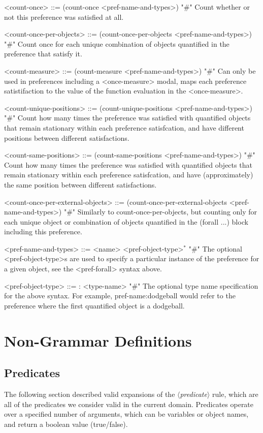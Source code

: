 \documentclass{article}
\newcommand{\dsl}[1]{{\it $\langle$#1$\rangle$}}
\begin{document}
\begin{grammar}
<count-once> ::= (count-once <pref-name-and-types>) "#" Count whether or not this preference was satisfied at all.

<count-once-per-objects> ::= (count-once-per-objects <pref-name-and-types>) "#" Count once for each unique combination of objects quantified in the preference that satisfy it.

<count-measure> ::= (count-measure <pref-name-and-types>) "#" Can only be used in preferences including a <once-measure> modal, maps each preference satistifaction to the value of the function evaluation in the <once-measure>.

<count-unique-positions> ::= (count-unique-positions <pref-name-and-types>) "#" Count how many times the preference was satisfied with quantified objects that remain stationary within each preference satisfcation, and have different positions between different satisfactions.

<count-same-positions> ::= (count-same-positions <pref-name-and-types>) "#" Count how many times the preference was satisfied with quantified objects that remain stationary within each preference satisfcation, and have (approximately) the same position between different satisfactions.

<count-once-per-external-objects> ::=  (count-once-per-external-objects <pref-name-and-types>) "#" Similarly to count-once-per-objects, but counting only for each unique object or combination of objects quantified in the (forall ...) block including this preference.

<pref-name-and-types> ::= <name> <pref-object-type>$^*$ "#" The optional <pref-object-type>s are used to specify a particular instance of the preference for a given object, see the <pref-forall> syntax above.

    <pref-object-type> ::= : <type-name>  "#" The optional type name specification for the above syntax. For example, pref-name:dodgeball would refer to the preference where the first quantified object is a dodgeball.
    



\end{grammar}



\section{Non-Grammar Definitions}


\subsection{Predicates} \label{sec:predicates}
The following section described valid expansions of the \dsl{predicate} rule,
        which are all of the predicates we consider valid in the current domain.
        Predicates operate over a specified number of arguments, which can be variables or object names, and return a boolean value (true/false).
\end{document}
